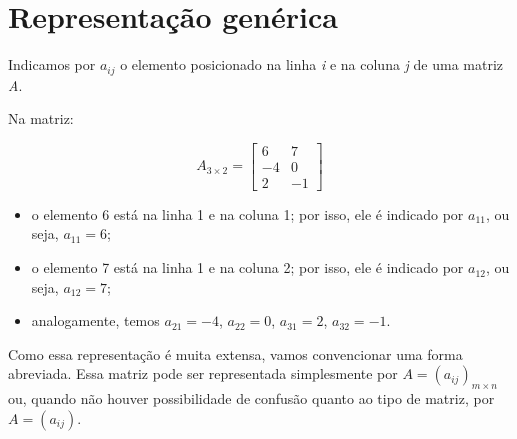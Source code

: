 \section{Representação genérica}

Indicamos por \textbf{$a_{ij}$} o elemento posicionado na linha \textit{i} e na coluna \textit{j} de uma matriz \textit{A}.

Na matriz:

\begin{equation*}
  A_{3 \times 2} = \begin{bmatrix}
    6 & 7 \\
    -4 & 0 \\
    2 & -1
  \end{bmatrix}
\end{equation*}

\begin{itemize}
  \item o elemento 6 está na linha 1 e na coluna 1; por isso, ele é indicado por $a_{11}$, ou seja, $a_{11} = 6$;
  \item o elemento 7 está na linha 1 e na coluna 2; por isso, ele é indicado por $a_{12}$, ou seja, $a_{12} = 7$;
  \item analogamente, temos $a_{21} = -4$, $a_{22} = 0$, $a_{31} = 2$, $a_{32} = -1$.
\end{itemize}

  Como essa representação é muita extensa, vamos convencionar uma forma abreviada. Essa matriz pode ser representada simplesmente por 
  $A = (a_{ij})_{m \times n}$ ou, quando não houver possibilidade de confusão quanto ao tipo de matriz, por $A = (a_{ij})$.


